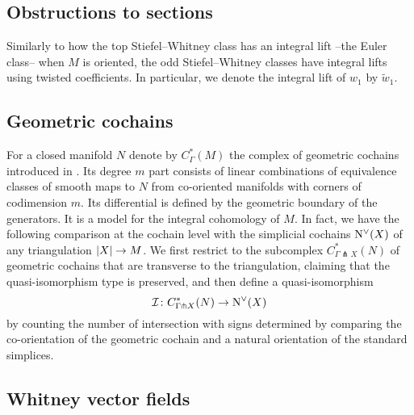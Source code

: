 \subsection*{Obstructions to sections}

Similarly to how the top Stiefel--Whitney class has an integral lift --the Euler class-- when $M$ is oriented, the odd Stiefel--Whitney classes have integral lifts using twisted coefficients.
In particular, we denote the integral lift of $w_1$ by $\widetilde w_1$.

\subsection*{Geometric cochains}

For a closed manifold $N$ denote by $C^*_{\Gamma}(M)$ the complex of geometric cochains introduced in \cite{medina2021flowing}.
Its degree $m$ part consists of linear combinations of equivalence classes of smooth maps to $N$ from co-oriented manifolds with corners of codimension $m$.
Its differential is defined by the geometric boundary of the generators.
It is a model for the integral cohomology of $M$.
In fact, we have the following comparison at the cochain level with the simplicial cochains $\operatorname{N^{\vee}}(X)$ of any triangulation $\lvert X\rvert \to M$.
We first restrict to the subcomplex $C^*_{\Gamma \pitchfork X}(N)$ of geometric cochains that are transverse to the triangulation, claiming that the quasi-isomorphism type is preserved, and then define a quasi-isomorphism
\[
\mathcal{I} \colon C^*_{\Gamma \pitchfork X}(N) \to \operatorname{N^{\vee}}(X)
\]
by counting the number of intersection with signs determined by comparing the co-orientation of the geometric cochain and a natural orientation of the standard simplices.

\subsection*{Whitney vector fields}

